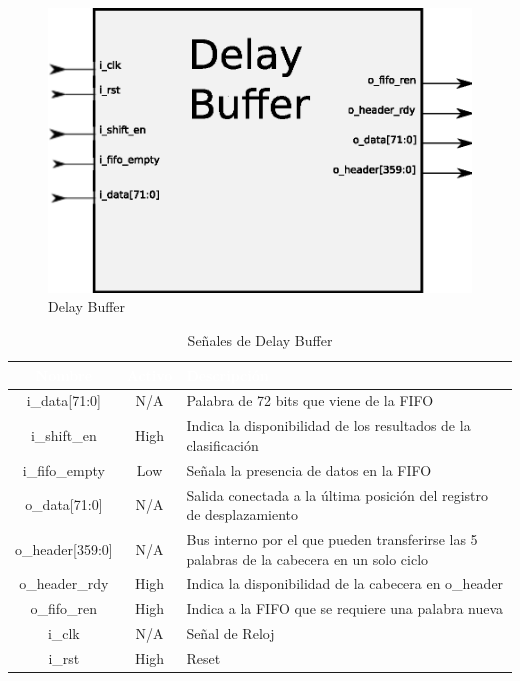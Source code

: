 \begin{figure}[H]
  \centering
	\includegraphics[scale=0.60]{3-arquitectura/graf/bloqdelaybuffer.eps}
  \caption{Delay Buffer}
  \label{fig:dbuffer}
\end{figure}


\begin{table}
	\begin{tabular}{|c|c|p{9cm}|} \hline
\rowcolor[gray]{0.1} \textcolor{white}{Nombre} & \textcolor{white}{Activo} & \textcolor{white}{Descripción}\\ \hline
\rowcolor[gray]{0.75} i\_data[71:0]	& N/A & Palabra de 72 bits que viene de la FIFO\\ \hline
\rowcolor[gray]{0.75} i\_shift\_en & High & Indica la disponibilidad de los resultados de la clasificación\\ \hline
\rowcolor[gray]{0.75} i\_fifo\_empty & Low & Señala la presencia de datos en la FIFO\\ \hline
\rowcolor[gray]{0.9} o\_data[71:0] & N/A & Salida conectada a la última posición del registro de desplazamiento\\ \hline
\rowcolor[gray]{0.9} o\_header[359:0] & N/A & Bus interno por el que pueden transferirse las 5 palabras de la cabecera en un solo ciclo\\ \hline
\rowcolor[gray]{0.9} o\_header\_rdy & High & Indica la disponibilidad de la cabecera en o\_header \\ \hline
\rowcolor[gray]{0.9} o\_fifo\_ren & High & Indica a la FIFO que se requiere una palabra nueva\\ \hline
 i\_clk & N/A & Señal de Reloj\\ \hline
 i\_rst & High & Reset\\ \hline
	\end{tabular}
	\caption{Señales de Delay Buffer}
	\label{tab:sigdb}
\end{table}


